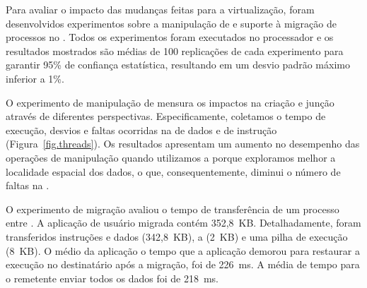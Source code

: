 Para avaliar o impacto das mudanças feitas para a virtualização, foram desenvolvidos experimentos sobre a manipulação de \threads e suporte à migração de processos no \nanvix. Todos os experimentos foram executados no processador \mppa e os resultados mostrados são médias de 100 replicações de cada experimento para garantir 95\% de confiança estatística, resultando em um desvio padrão máximo inferior a 1\%.

O experimento de manipulação de \threads mensura os impactos na criação e junção através de diferentes perspectivas. Especificamente, coletamos o tempo de execução, desvios e faltas ocorridas na \cache de dados e de instrução (Figura~\ref{fig.threads}).
Os resultados apresentam um aumento no desempenho das operações de manipulação quando utilizamos a \uarea porque exploramos melhor a localidade espacial dos dados, o que, consequentemente, diminui o número de faltas na \cache.

O experimento de migração avaliou o tempo de transferência de um processo entre \clusters.
A aplicação de usuário migrada contém 352,8~KB. Detalhadamente, foram transferidos instruções e dados (342,8~KB), a \uarea (2~KB) e uma pilha de execução (8~KB). O \downtime médio da aplicação \ie o tempo que a aplicação demorou para restaurar a execução no \cluster destinatário após a migração, foi de 226~ms. A média de tempo para o \cluster remetente enviar todos os dados foi de 218~ms.